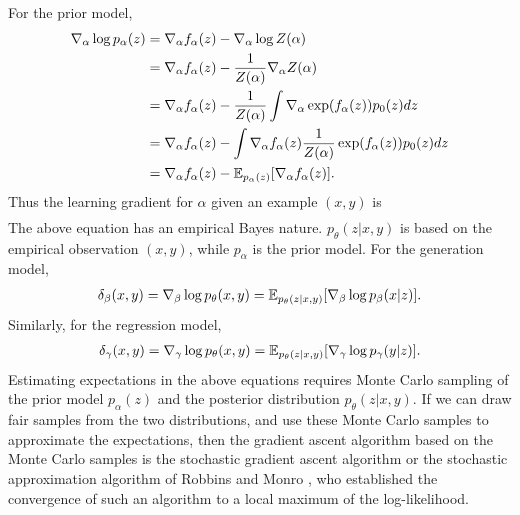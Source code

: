 \documentclass[accepted]{uai2023} %
\begin{document}
For the prior model, 
\begin{align*}
    \nabla_\alpha \log p_\alpha(z) &= \nabla_\alpha f_\alpha(z) - \nabla_\alpha \log Z(\alpha) \\
    &= \nabla_\alpha f_\alpha(z) -\frac{1}{Z(\alpha)} \nabla_\alpha  Z(\alpha) \\
     &= \nabla_\alpha f_\alpha(z) -\frac{1}{Z(\alpha)}  \int  \nabla_\alpha \exp(f_\alpha(z)) p_0(z) dz \\
      &= \nabla_\alpha f_\alpha(z) -  \int  \nabla_\alpha f_\alpha(z) \frac{1}{Z(\alpha)} \exp(f_\alpha(z)) p_0(z) dz \\
    &=  \nabla_\alpha f_\alpha(z) - \mathbb{E}_{p_\alpha(z)}[ \nabla_\alpha f_\alpha(z)]. 
\end{align*}
Thus the learning gradient for $\alpha$ given an example $(x, y)$ is
\begin{align} 
\end{align}
The above equation has an empirical Bayes nature. $p_\theta(z|x, y)$ is based on the empirical observation $(x, y)$, while $p_\alpha$ is the prior model. 
For the generation model,
\begin{align} 
\begin{split}
  \delta_\beta(x, y) =  \nabla_\beta \log p_\theta(x, y)  = \mathbb{E}_{p_\theta(z|x, y)} [\nabla_\beta \log p_{\beta}(x|z)].
\end{split}
\end{align} 
Similarly, for the regression model, 
\begin{align} 
\begin{split}
  \delta_\gamma(x, y) =  \nabla_\gamma \log p_\theta(x, y)  = \mathbb{E}_{p_\theta(z|x, y)} [\nabla_\gamma \log p_{\gamma}(y|z)].
\end{split}
\end{align} 
Estimating expectations in the above equations requires Monte Carlo sampling of the prior model $p_\alpha(z)$ and the posterior distribution $p_\theta(z|x,y)$. If we can draw fair samples from the two distributions, and use these Monte Carlo samples to approximate the expectations, then the gradient ascent algorithm based on the Monte Carlo samples is the stochastic gradient ascent algorithm or the stochastic approximation algorithm of Robbins and Monro \citep{robbins1951stochastic}, who established the convergence of such an algorithm to a local maximum of the log-likelihood. 
\end{document}
